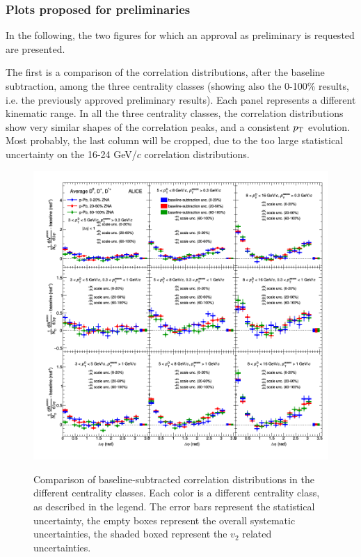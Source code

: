 \subsubsection{Plots proposed for preliminaries}
In the following, the two figures for which an approval as preliminary is requested are presented.

The first is a comparison of the correlation distributions, after the baseline subtraction, among the three centrality classes (showing also the 0-100\% results, i.e. the previously approved preliminary results). Each panel represents a different kinematic range. In all the three centrality classes, the correlation distributions show very similar shapes of the correlation peaks, and a consistent $p_{\rm T}$ evolution. Most probably, the last column will be cropped, due to the too large statistical uncertainty on the 16-24 GeV/$c$ correlation distributions.

\begin{landscape}
\begin{figure}
\centering
{\includegraphics[width=0.9\linewidth]{figuresVsCent/Averages/Trends/plotComparison_WeightedAverage_pp_pPb_UniqueCanvas_Style1_FinalQM.png}}
 \caption{Comparison of baseline-subtracted correlation distributions in the different centrality classes. Each color is a different centrality class, as described in the legend. The error bars represent the statistical uncertainty, the empty boxes represent the overall systematic uncertainties, the shaded boxed represent the $v_2$ related uncertainties.}
\label{fig:prel1}
\end{figure}
\end{landscape}


